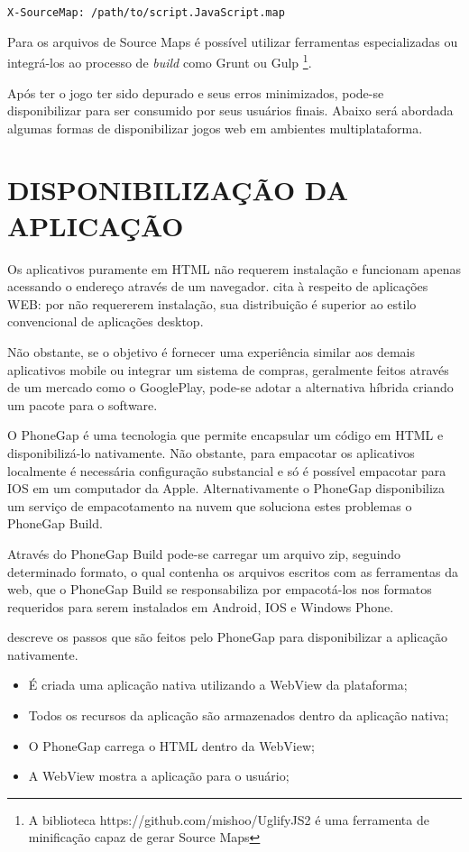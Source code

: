 \begin{verbatim}
X-SourceMap: /path/to/script.JavaScript.map
\end{verbatim}

Para os arquivos de Source Maps é possível utilizar ferramentas
especializadas ou integrá-los ao processo de \textit{build} como Grunt ou Gulp
\footnote{A biblioteca https://github.com/mishoo/UglifyJS2 é uma
ferramenta de minificação capaz de gerar Source Maps}.

Após ter o jogo ter sido depurado e seus erros minimizados, pode-se
disponibilizar para ser consumido por seus usuários finais.
Abaixo será abordada algumas formas de disponibilizar jogos web em
ambientes multiplataforma.

\section{DISPONIBILIZAÇÃO DA APLICAÇÃO}

Os aplicativos puramente em HTML não requerem instalação e
funcionam apenas acessando o endereço através de um navegador.
\autocite{browserGamesTechnologyAndFuture} cita à respeito de
aplicações WEB: por não requererem instalação, sua distribuição é
superior ao estilo convencional de aplicações desktop.

Não obstante, se o objetivo é fornecer uma experiência similar aos
demais aplicativos mobile ou integrar um sistema de compras, geralmente
feitos através de um mercado como o GooglePlay, pode-se adotar a
alternativa híbrida criando um pacote para o software.

O PhoneGap é uma tecnologia que permite encapsular um código em
HTML e disponibilizá-lo nativamente. Não obstante, para empacotar
os aplicativos localmente é necessária configuração substancial
e só é possível empacotar para IOS em um computador da Apple.
Alternativamente o PhoneGap disponibiliza um serviço de empacotamento
na nuvem que soluciona estes problemas o PhoneGap Build.

Através do PhoneGap Build pode-se carregar um arquivo zip, seguindo
determinado formato, o qual contenha os arquivos escritos com as
ferramentas da web, que o PhoneGap Build se responsabiliza por
empacotá-los nos formatos requeridos para serem instalados em Android,
IOS e Windows Phone.

\cite{publishHtml5} descreve os passos que são feitos pelo PhoneGap para 
disponibilizar a aplicação nativamente.

\begin{itemize}
\item É criada uma aplicação nativa utilizando a WebView da plataforma;
\item Todos os recursos da aplicação são armazenados dentro da aplicação nativa;
\item O PhoneGap carrega o HTML dentro da WebView;
\item A WebView mostra a aplicação para o usuário;
\end{itemize}

